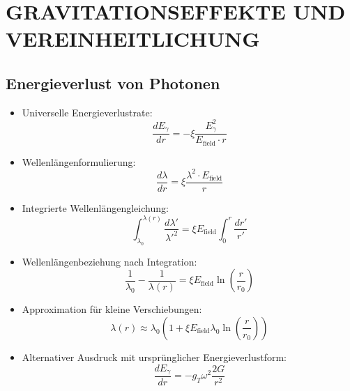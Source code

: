 \documentclass[12pt,a4paper]{article}
\begin{document}
	\section{GRAVITATIONSEFFEKTE UND VEREINHEITLICHUNG}
	
	\subsection{Energieverlust von Photonen}
	\begin{itemize}
		\item Universelle Energieverlustrate:
		$$\boxed{\frac{dE_\gamma}{dr} = -\xi \frac{E_\gamma^2}{E_{\text{field}} \cdot r}}$$
		
		\item Wellenl\"{a}ngenformulierung:
		$$\frac{d\lambda}{dr} = \xi \frac{\lambda^2 \cdot E_{\text{field}}}{r}$$
		
		\item Integrierte Wellenl\"{a}ngengleichung:
		$$\int_{\lambda_0}^{\lambda(r)} \frac{d\lambda'}{\lambda'^2} = \xi E_{\text{field}} \int_0^r \frac{dr'}{r'}$$
		
		\item Wellenl\"{a}ngenbeziehung nach Integration:
		$$\frac{1}{\lambda_0} - \frac{1}{\lambda(r)} = \xi E_{\text{field}} \ln\left(\frac{r}{r_0}\right)$$
		
		\item Approximation f\"{u}r kleine Verschiebungen:
		$$\lambda(r) \approx \lambda_0 \left(1 + \xi E_{\text{field}} \lambda_0 \ln\left(\frac{r}{r_0}\right)\right)$$
		
		\item Alternativer Ausdruck mit urspr\"{u}nglicher Energieverlustform:
		$$\frac{dE_\gamma}{dr} = -g_T \omega^2 \frac{2G}{r^2}$$
	\end{itemize}
	
\end{document}
